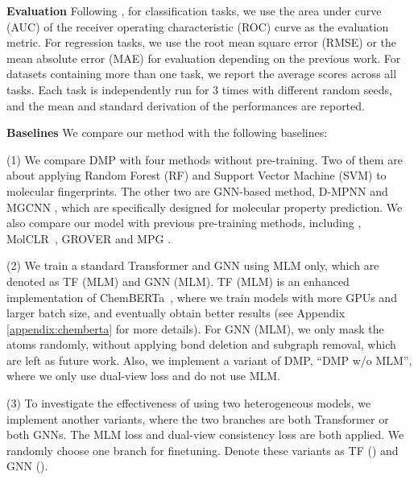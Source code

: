 \documentclass{article}
\newcommand{\ourM}{DMP}
\begin{document}
\noindent\textbf{Evaluation}
Following \cite{wu2018moleculenet}, for classification tasks, we use the area under curve (AUC) of the receiver operating characteristic (ROC) curve as the evaluation metric. For regression tasks, we use the root mean square error (RMSE) or the mean absolute error (MAE) for evaluation depending on the previous work. For datasets containing more than one task, we report the average scores across all tasks. Each task is independently run for 3 times with different random seeds, and the mean and standard derivation of the performances are reported. 

\noindent\textbf{Baselines} We compare our method with the following baselines:

\noindent(1) We compare \ourM{} with four methods without pre-training. Two of them are about applying Random Forest (RF) \citep{ho1995random} and Support Vector Machine (SVM) \citep{cortes1995support} to molecular fingerprints. The other two are GNN-based method, D-MPNN \citep{yang2019analyzing} and MGCNN \citep{lu2019molecular}, which are specifically designed for molecular property prediction. We also compare our model with previous pre-training methods, including \citet{hu2019strategies}, MolCLR~\citep{wang2021molclr}, GROVER \citep{rong2020self} and MPG \citep{li2020learn}.



\noindent(2) We train a standard Transformer and GNN using MLM only, which are denoted as TF (MLM) and GNN (MLM). TF (MLM) is an enhanced implementation of ChemBERTa~\cite{chithrananda2020chemberta}, where we train models with more GPUs and larger batch size, and eventually obtain better results (see Appendix \ref{appendix:chemberta} for more details). For GNN (MLM), we only mask the atoms randomly, without applying bond deletion and subgraph removal, which are left as future work. Also, we implement a variant of \ourM{}, ``\ourM{} w/o MLM'',  where we only use dual-view loss and do not use MLM.

\noindent(3) To investigate the effectiveness of using two heterogeneous models, we implement another variants, where the two branches are both Transformer or both GNNs. The MLM loss and dual-view consistency loss are both applied. We randomly choose one branch for finetuning. Denote these variants as TF () and GNN ().
\end{document}
